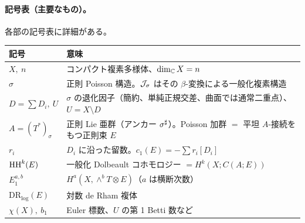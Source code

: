 \paragraph{記号表（主要なもの）。}各部の記号表に詳細がある。
\begin{center}\small
\begin{tabular}{>{\raggedright\arraybackslash}p{3.2cm}>{\raggedright\arraybackslash}p{11.6cm}}
\toprule 記号 & 意味\\\midrule
$X,\ n$ & コンパクト複素多様体、$\dim_\mathbb C X=n$\\
$\sigma$ & 正則 Poisson 構造。$\mathcal J_\sigma$ はその $\beta$-変換による一般化複素構造\\
$D=\sum D_i,\ U$ & $\sigma$ の退化因子（簡約、単純正規交差、曲面では通常二重点）、$U=X\setminus D$\\
$A=(T^*)_\sigma$ & 正則 Lie 亜群（アンカー $\sigma^\sharp$）。Poisson 加群 $=$ 平坦 $A$-接続をもつ正則束 $E$\\
$r_i$ & $D_i$ に沿った留数。$c_1(E)=-\sum r_i[D_i]$\\
$\mathrm{HH}^k(E)$ & 一般化 Dolbeault コホモロジー $=H^k(X;C(A;E))$\\
$E_1^{a,b}$ & $H^a(X,\wedge^bT\otimes E)$（$a$ は横断次数）\\
$\mathrm{DR}_{\log}(E)$ & 対数 de Rham 複体\\
$\chi(X),\ b_1$ & Euler 標数、$U$ の第 1 Betti 数など\\\bottomrule
\end{tabular}
\end{center}
